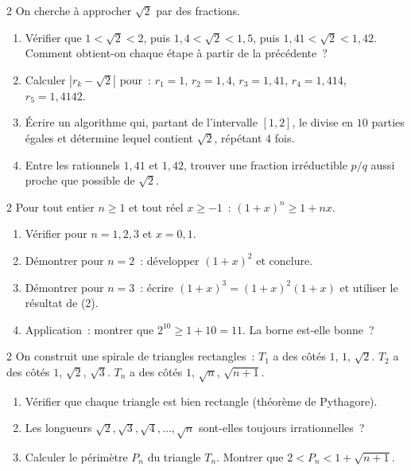 \begin{probleme}{2}
On cherche \`a approcher $\sqrt{2}$ par des fractions.
\begin{enumerate}
  \item V\'erifier que $1 < \sqrt{2} < 2$, puis $1{,}4 < \sqrt{2} < 1{,}5$,
        puis $1{,}41 < \sqrt{2} < 1{,}42$.
        Comment obtient-on chaque \'etape \`a partir de la pr\'ec\'edente~?
  \item Calculer $|r_k - \sqrt{2}|$ pour~:
        $r_1=1$, $r_2=1{,}4$, $r_3=1{,}41$, $r_4=1{,}414$, $r_5=1{,}4142$.
  \item \'Ecrire un algorithme qui, partant de l'intervalle $[1,2]$,
        le divise en $10$ parties \'egales et d\'etermine lequel contient
        $\sqrt{2}$, r\'ep\'etant $4$ fois. \computer
  \item Entre les rationnels $1{,}41$ et $1{,}42$, trouver une fraction
        irr\'eductible $p/q$ aussi proche que possible de $\sqrt{2}$.
\end{enumerate}
\end{probleme}

\begin{probleme}{2}
Pour tout entier $n \geq 1$ et tout r\'eel $x \geq -1$~:
$(1+x)^n \geq 1 + nx$.
\begin{enumerate}
  \item V\'erifier pour $n=1,2,3$ et $x=0{,}1$.
  \item D\'emontrer pour $n=2$~: d\'evelopper $(1+x)^2$ et conclure.
  \item D\'emontrer pour $n=3$~: \'ecrire $(1+x)^3 = (1+x)^2(1+x)$
        et utiliser le r\'esultat de (2).
  \item Application~: montrer que $2^{10} \geq 1 + 10 = 11$.
        La borne est-elle bonne~?
\end{enumerate}
\end{probleme}

\begin{probleme}{2}
On construit une spirale de triangles rectangles~:
$T_1$ a des c\^ot\'es $1$, $1$, $\sqrt{2}$.
$T_2$ a des c\^ot\'es $1$, $\sqrt{2}$, $\sqrt{3}$.
$T_n$ a des c\^ot\'es $1$, $\sqrt{n}$, $\sqrt{n+1}$.
\begin{enumerate}
  \item V\'erifier que chaque triangle est bien rectangle
        (th\'eor\`eme de Pythagore).
  \item Les longueurs $\sqrt{2},\sqrt{3},\sqrt{4},\ldots,\sqrt{n}$
        sont-elles toujours irrationnelles~?
  \item Calculer le p\'erim\`etre $P_n$ du triangle $T_n$.
        Montrer que $2 < P_n < 1 + \sqrt{n+1}$.
\end{enumerate}
\end{probleme}

